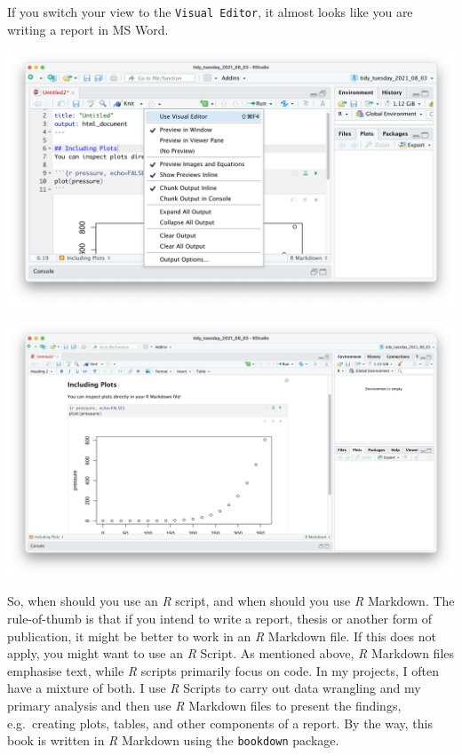 \documentclass[
  letterpaper,
]{krantz}
\begin{document}
If you switch your view to the \texttt{Visual\ Editor}, it almost looks
like you are writing a report in MS Word.

\includegraphics{images/chapter_06_img/03_r_markdown/02_r_markdown_visual_editor_menu.png}

\includegraphics{images/chapter_06_img/03_r_markdown/03_r_markdown_visual_editor.png}

So, when should you use an \emph{R} script, and when should you use
\emph{R} Markdown. The rule-of-thumb is that if you intend to write a
report, thesis or another form of publication, it might be better to
work in an \emph{R} Markdown file. If this does not apply, you might
want to use an \emph{R} Script. As mentioned above, \emph{R} Markdown
files emphasise text, while \emph{R} scripts primarily focus on code. In
my projects, I often have a mixture of both. I use \emph{R} Scripts to
carry out data wrangling and my primary analysis and then use \emph{R}
Markdown files to present the findings, e.g.~creating plots, tables, and
other components of a report. By the way, this book is written in
\emph{R} Markdown using the \texttt{bookdown} package.
\end{document}
